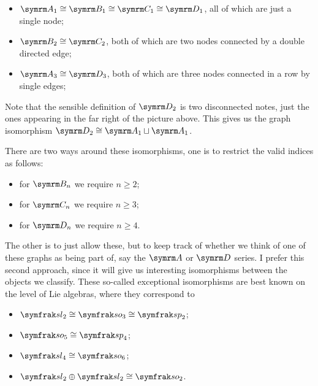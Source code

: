 \begin{itemize}
    \item \(\A[1] \isomorphic \B[1] \isomorphic \C[1] \isomorphic \D[1]\), all of which are just a single node;
    \item \(\B[2] \isomorphic \C[2]\), both of which are two nodes connected by a double directed edge;
    \item \(\A[3] \isomorphic \D[3]\), both of which are three nodes connected in a row by single edges;
\end{itemize}
Note that the sensible definition of \(\D[2]\) is two disconnected notes, just the ones appearing in the far right of the picture above.
This gives us the graph isomorphism \(\D[2] \isomorphic \A[1] \sqcup \A[1]\).

There are two ways around these isomorphisms, one is to restrict the valid indices as follows:
\begin{itemize}
    \item for \(\B[n]\) we require \(n \ge 2\);
    \item for \(\C[n]\) we require \(n \ge 3\);
    \item for \(\D[n]\) we require \(n \ge 4\).
\end{itemize}
The other is to just allow these, but to keep track of whether we think of one of these graphs as being part of, say the \(\A\) or \(\D\) series.
I prefer this second approach, since it will give us interesting isomorphisms between the objects we classify.
These so-called exceptional isomorphisms are best known on the level of Lie algebras, where they correspond to
\begin{itemize}
    \item \(\specialLinearLie_2 \isomorphic \specialOrthogonalLie_3 \isomorphic \symplecticLie_2\);
    \item \(\specialOrthogonalLie_5 \isomorphic \symplecticLie_4\);
    \item \(\specialLinearLie_4 \isomorphic \specialOrthogonalLie_6\);
    \item \(\specialLinearLie_2 \oplus \specialLinearLie_2 \isomorphic \specialOrthogonalLie_2\).
\end{itemize}

